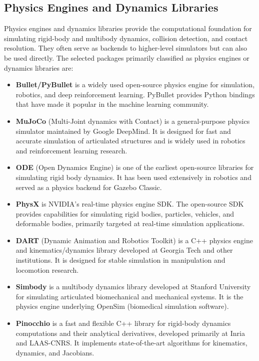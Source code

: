 \subsection{Physics Engines and Dynamics Libraries}
\label{subsec:physics-engines-dynamics-libraries}

Physics engines and dynamics libraries provide the computational foundation for simulating rigid-body and multibody dynamics, collision detection, and contact resolution. They often serve as backends to higher-level simulators but can also be used directly. The selected packages primarily classified as physics engines or dynamics libraries are:

\begin{itemize}
    \item \textbf{Bullet/PyBullet} is a widely used open-source physics engine for simulation, robotics, and deep reinforcement learning. PyBullet provides Python bindings that have made it popular in the machine learning community.
    \item \textbf{MuJoCo} (Multi-Joint dynamics with Contact) is a general-purpose physics simulator maintained by Google DeepMind. It is designed for fast and accurate simulation of articulated structures and is widely used in robotics and reinforcement learning research.
    \item \textbf{ODE} (Open Dynamics Engine) is one of the earliest open-source libraries for simulating rigid body dynamics. It has been used extensively in robotics and served as a physics backend for Gazebo Classic.
    \item \textbf{PhysX} is NVIDIA's real-time physics engine SDK. The open-source SDK provides capabilities for simulating rigid bodies, particles, vehicles, and deformable bodies, primarily targeted at real-time simulation applications.
    \item \textbf{DART} (Dynamic Animation and Robotics Toolkit) is a C++ physics engine and kinematics/dynamics library developed at Georgia Tech and other institutions. It is designed for stable simulation in manipulation and locomotion research.
    \item \textbf{Simbody} is a multibody dynamics library developed at Stanford University for simulating articulated biomechanical and mechanical systems. It is the physics engine underlying OpenSim (biomedical simulation software).
    \item \textbf{Pinocchio} is a fast and flexible C++ library for rigid-body dynamics computations and their analytical derivatives, developed primarily at Inria and LAAS-CNRS. It implements state-of-the-art algorithms for kinematics, dynamics, and Jacobians.

\end{itemize}
